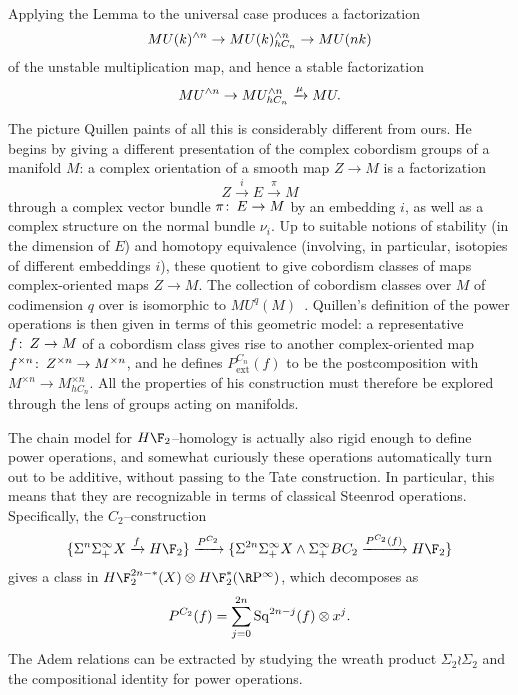Applying the Lemma to the universal case produces a factorization \[MU(k)^{\wedge n} \to MU(k)^{\wedge n}_{hC_n} \to MU(nk)\] of the unstable multiplication map, and hence a stable factorization \[MU^{\wedge n} \to MU^{\wedge n}_{hC_n} \xrightarrow{\mu} MU.\]

\begin{remark}
The picture Quillen paints of all this is considerably different from ours.  He begins by giving a different presentation of the complex cobordism groups of a manifold $M$: a complex orientation of a smooth map $Z \to M$ is a factorization \[Z \xrightarrow{i} E \xrightarrow{\pi} M\] through a complex vector bundle $\pi\colon\thinspace E \to M$ by an embedding $i$, as well as a complex structure on the normal bundle $\nu_i$.  Up to suitable notions of stability (in the dimension of $E$) and homotopy equivalence (involving, in particular, isotopies of different embeddings $i$), these quotient to give cobordism classes of maps complex-oriented maps $Z \to M$.  The collection of cobordism classes over $M$ of codimension $q$ over is isomorphic to $MU^q(M)$~\cite[Proposition 1.2]{Quillen}.  Quillen's definition of the power operations is then given in terms of this geometric model: a representative $f\colon\thinspace Z \to M$ of a cobordism class gives rise to another complex-oriented map $f^{\times n}\colon\thinspace Z^{\times n} \to M^{\times n}$, and he defines $P^{C_n}_{\mathrm{ext}}(f)$ to be the postcomposition with $M^{\times n} \to M^{\times n}_{hC_n}$.  All the properties of his construction must therefore be explored through the lens of groups acting on manifolds.
\end{remark}

\begin{example}
The chain model for $H\F_2$--homology is actually also rigid enough to define power operations, and somewhat curiously these operations automatically turn out to be additive, without passing to the Tate construction.  In particular, this means that they are recognizable in terms of classical Steenrod operations.  Specifically, the $C_2$--construction \[\{\Susp^n \Susp^\infty_+ X \xrightarrow{f} H\F_2\} \xrightarrow{P^{C_2}} \{\Susp^{2n} \Susp^\infty_+ X \sm \Susp^\infty_+ BC_2 \xrightarrow{P^{C_2}(f)} H\F_2\}\] gives a class in $H\F_2^{2n-*}(X) \otimes H\F_2^*(\RP^\infty)$, which decomposes as \[P^{C_2}(f) = \sum_{j=0}^{2n} \operatorname{Sq}^{2n-j}(f) \otimes x^j.\]  The Adem relations can be extracted by studying the wreath product $\Sigma_2 \wr \Sigma_2$ and the compositional identity for power operations.
\end{example}

